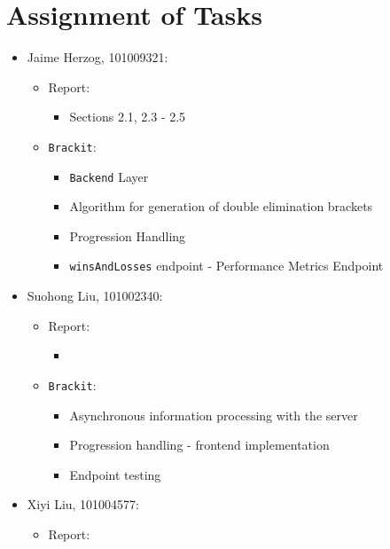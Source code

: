 \documentclass{article}
\begin{document}
\clearpage
\section{Assignment of Tasks}
\begin{itemize}
    \item{Jaime Herzog, 101009321: 
        \begin{itemize}
            \item{Report: 
                \begin{itemize}
                    \item{Sections 2.1, 2.3 - 2.5}
                \end{itemize}
            }
            \item{\texttt{Brackit}: 
                \begin{itemize}
                    \item{\texttt{Backend} Layer}
                    \item{Algorithm for generation of double elimination brackets}
                    \item{Progression Handling}
                    \item{\texttt{winsAndLosses} endpoint - Performance Metrics Endpoint}
                \end{itemize}
            }
        \end{itemize}
    }
    \item{Suohong Liu, 101002340:
    \begin{itemize}
        \item{Report:
            \begin{itemize}
                \item{}
            \end{itemize}
        }
        \item{\texttt{Brackit}:
            \begin{itemize}
                \item{Asynchronous information processing with the server}
                \item{Progression handling - frontend implementation}
                \item{Endpoint testing}
            \end{itemize}
        }
    \end{itemize}
    }
    \item{Xiyi Liu, 101004577:
        \begin{itemize}
            \item{Report:
}
\end{itemize}}
\end{itemize}
\end{document}
